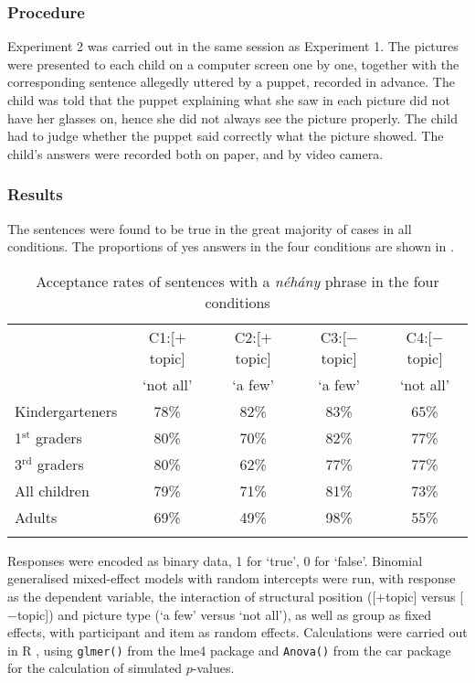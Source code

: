 \documentclass[output=paper]{langscibook}
\begin{document}
\subsubsection{Procedure}

Experiment 2 was carried out in the same session as Experiment 1. The pictures were presented to each child on a computer screen one by one, together with the corresponding sentence allegedly uttered by a puppet, recorded in advance. The child was told that the puppet explaining what she saw in each picture did not have her glasses on, hence she did not always see the picture properly. The child had to judge whether the puppet said correctly what the picture showed. The child’s answers were recorded both on paper, and by video camera.

\subsubsection{Results}

The sentences were found to be true in the great majority of cases in all conditions.  The proportions of yes answers in the four conditions are shown in .

\begin{table}
\centering
\begin{tabular}{l c c c c}
\lsptoprule
{} & C1:[$+$topic] & C2:[$+$topic] & C3:[$-$topic]  & C4:[$-$topic] \\
{} & `not all' & `a few' & `a few' & `not all' \\
\midrule
Kindergarteners & 78\% & 82\% & 83\% & 65\% \\
1$^\text{st}$ graders & 80\% & 70\% & 82\% & 77\% \\
3$^\text{rd}$ graders & 80\% & 62\% & 77\% & 77\% \\
\midrule
All children & 79\% & 71\% & 81\% & 73\% \\
Adults	 & 69\% & 49\% & 98\% & 55\% \\
\lspbottomrule
\end{tabular}
\caption{Acceptance rates of sentences with a \textit{néhány} phrase in the four conditions}
\label{kis-zet:table:2}
\end{table}

Responses were encoded as binary data, 1 for `true', 0 for `false'. Binomial generalised mixed-effect models with random intercepts were run, with response as the dependent variable, the interaction of structural position ([$+$topic] versus [$-$topic]) and picture type (`a few' versus `not all'), as well as group as fixed effects, with participant and item as random effects. Calculations were carried out in R \citep{rcore19}, using \texttt{glmer()} from the lme4 package \citep{bates2015fitting} and \texttt{Anova()} from the car package \citep{fox2018r} for the calculation of simulated $p$-values.
\end{document}
